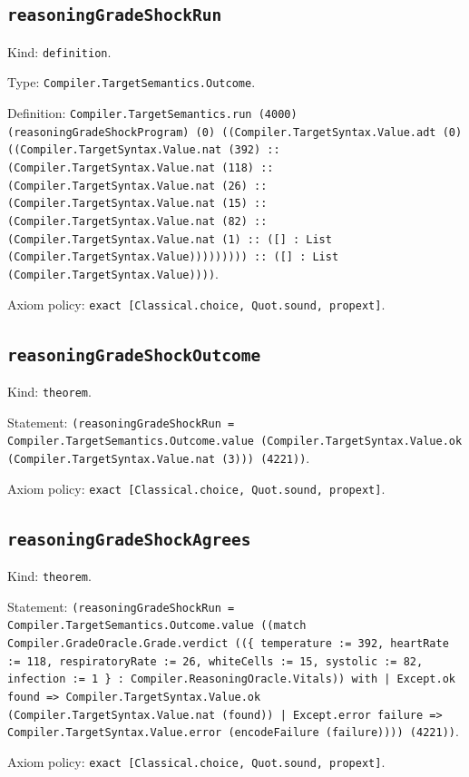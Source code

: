 \documentclass[11pt]{article}
\begin{document}
\subsection*{\texttt{reasoningGradeShockRun}}
\noindent Kind: \texttt{definition}.\par
\noindent Type: \texttt{Compiler.TargetSemantics.Outcome}.\par
\noindent Definition: \texttt{Compiler.TargetSemantics.run (4000) (reasoningGradeShockProgram) (0) ((Compiler.TargetSyntax.Value.adt (0) ((Compiler.TargetSyntax.Value.nat (392) :: (Compiler.TargetSyntax.Value.nat (118) :: (Compiler.TargetSyntax.Value.nat (26) :: (Compiler.TargetSyntax.Value.nat (15) :: (Compiler.TargetSyntax.Value.nat (82) :: (Compiler.TargetSyntax.Value.nat (1) :: ([] : List (Compiler.TargetSyntax.Value))))))))) :: ([] : List (Compiler.TargetSyntax.Value))))}.\par
\noindent Axiom policy: \texttt{exact [Classical.choice, Quot.sound, propext]}.\par
\subsection*{\texttt{reasoningGradeShockOutcome}}
\noindent Kind: \texttt{theorem}.\par
\noindent Statement: \texttt{(reasoningGradeShockRun = Compiler.TargetSemantics.Outcome.value (Compiler.TargetSyntax.Value.ok (Compiler.TargetSyntax.Value.nat (3))) (4221))}.\par
\noindent Axiom policy: \texttt{exact [Classical.choice, Quot.sound, propext]}.\par
\subsection*{\texttt{reasoningGradeShockAgrees}}
\noindent Kind: \texttt{theorem}.\par
\noindent Statement: \texttt{(reasoningGradeShockRun = Compiler.TargetSemantics.Outcome.value ((match Compiler.GradeOracle.Grade.verdict ((\{ temperature := 392, heartRate := 118, respiratoryRate := 26, whiteCells := 15, systolic := 82, infection := 1 \} : Compiler.ReasoningOracle.Vitals)) with | Except.ok found => Compiler.TargetSyntax.Value.ok (Compiler.TargetSyntax.Value.nat (found)) | Except.error failure => Compiler.TargetSyntax.Value.error (encodeFailure (failure)))) (4221))}.\par
\noindent Axiom policy: \texttt{exact [Classical.choice, Quot.sound, propext]}.\par
\end{document}
